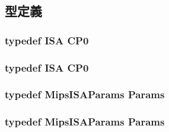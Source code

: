 \subsection{型定義}
\hypertarget{classMipsISA_1_1ISA_a21db2c38ad074e55f2b584fb5a5d37f3}{
\subsubsection[{CP0}]{\setlength{\rightskip}{0pt plus 5cm}typedef {\bf ISA} {\bf CP0}}}
\label{classMipsISA_1_1ISA_a21db2c38ad074e55f2b584fb5a5d37f3}
\hypertarget{classMipsISA_1_1ISA_a21db2c38ad074e55f2b584fb5a5d37f3}{
\subsubsection[{CP0}]{\setlength{\rightskip}{0pt plus 5cm}typedef {\bf ISA} {\bf CP0}}}
\label{classMipsISA_1_1ISA_a21db2c38ad074e55f2b584fb5a5d37f3}
\hypertarget{classMipsISA_1_1ISA_a356644158667486a7a343f11512e4dc7}{
\subsubsection[{Params}]{\setlength{\rightskip}{0pt plus 5cm}typedef MipsISAParams {\bf Params}}}
\label{classMipsISA_1_1ISA_a356644158667486a7a343f11512e4dc7}
\hypertarget{classMipsISA_1_1ISA_a356644158667486a7a343f11512e4dc7}{
\subsubsection[{Params}]{\setlength{\rightskip}{0pt plus 5cm}typedef MipsISAParams {\bf Params}}}
\label{classMipsISA_1_1ISA_a356644158667486a7a343f11512e4dc7}


